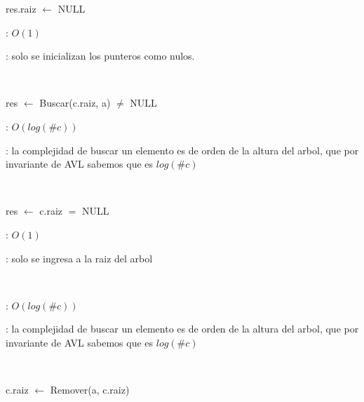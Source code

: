 \begin{Algoritmos}

	\begin{algorithm}[H]
		\NoCaptionOfAlgo
		\caption{}
		res.raiz $\leftarrow$ NULL
	\end{algorithm}

	\complejidad: $O(1)$

	\justifcomp: solo se inicializan los punteros como nulos.

	~

	\begin{algorithm}[H]
		\NoCaptionOfAlgo
		\caption{}
		res $\leftarrow$ Buscar(c.raiz, a) $\neq$ NULL
	\end{algorithm}

	\complejidad: $O(log(\#c))$

	\justifcomp: la complejidad de buscar un elemento es de orden de la altura del arbol, que por invariante de AVL sabemos que es $log(\#c)$

	~

	\begin{algorithm}[H]
		\NoCaptionOfAlgo
		\caption{}
		res $\leftarrow$ c.raiz $=$ NULL
	\end{algorithm}

	\complejidad: $O(1)$

	\justifcomp: solo se ingresa a la raiz del arbol

	~

	\begin{algorithm}[H]
		\NoCaptionOfAlgo
		\caption{}
	\end{algorithm}

	\complejidad: $O(log(\#c))$

	\justifcomp: la complejidad de buscar un elemento es de orden de la altura del arbol, que por invariante de AVL sabemos que es $log(\#c)$

	~

	\begin{algorithm}[H]
		\NoCaptionOfAlgo
		\caption{}
		c.raiz $\leftarrow$ Remover(a, c.raiz)
	\end{algorithm}


\end{Algoritmos}
